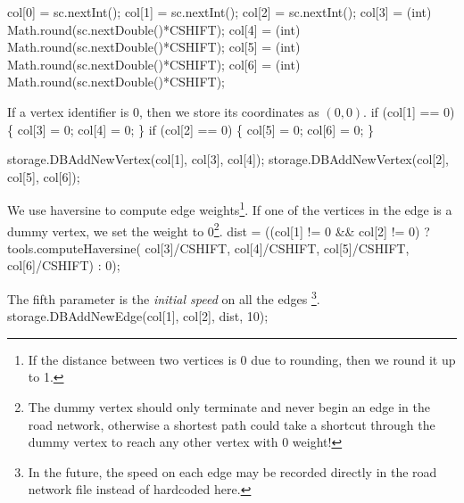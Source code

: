 \documentclass{article}
\def\nwendcode{\endtrivlist \endgroup}      %
\let\nwdocspar=\par
\begin{document}
col[0] = sc.nextInt();
col[1] = sc.nextInt();
col[2] = sc.nextInt();
col[3] = (int) Math.round(sc.nextDouble()*CSHIFT);
col[4] = (int) Math.round(sc.nextDouble()*CSHIFT);
col[5] = (int) Math.round(sc.nextDouble()*CSHIFT);
col[6] = (int) Math.round(sc.nextDouble()*CSHIFT);
\nwendcode{}\nwdocspar
If a vertex identifier is $0$, then we store its coordinates as $(0,0)$.
\nwenddocs{}\endmoddef{}
if (col[1] == 0) \{
  col[3] = 0;
  col[4] = 0;
\}
if (col[2] == 0) \{
  col[5] = 0;
  col[6] = 0;
\}
\nwendcode{}\nwdocspar
\nwenddocs{}\endmoddef{}
storage.DBAddNewVertex(col[1], col[3], col[4]);
storage.DBAddNewVertex(col[2], col[5], col[6]);
\nwendcode{}\nwdocspar
We use haversine to compute edge weights\footnote{If the distance between two
vertices is 0 due to rounding, then we round it up to 1.}.  If one of the
vertices in the edge is a dummy vertex, we set the weight to 0\footnote{The
dummy vertex should only terminate and never begin an edge in the road network,
otherwise a shortest path could take a shortcut through the dummy vertex to
reach any other vertex with 0 weight!}.
\nwenddocs{}\endmoddef{}
dist = ((col[1] != 0 && col[2] != 0)
  ? tools.computeHaversine(
        col[3]/CSHIFT, col[4]/CSHIFT,
        col[5]/CSHIFT, col[6]/CSHIFT) : 0);
\nwendcode{}\nwdocspar
The fifth parameter is the \textit{initial speed} on all the edges \footnote{In
the future, the speed on each edge may be recorded directly in the road network
file instead of hardcoded here.}.
\nwenddocs{}\endmoddef{}
storage.DBAddNewEdge(col[1], col[2], dist, 10);
\nwendcode{}\nwdocspar
\end{document}
